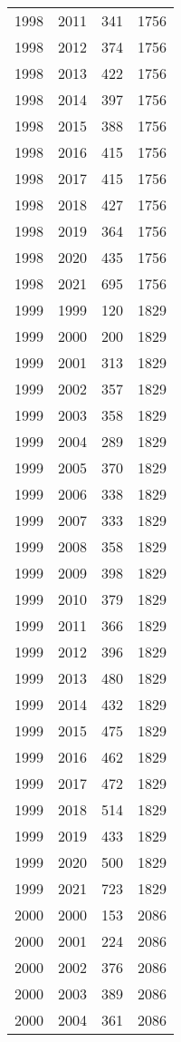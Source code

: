 \documentclass[
  11pt,
  letterpaper,
  DIV=11,
  numbers=noendperiod,
  twoside]{scrartcl}
\begin{document}
\begin{longtable}[]{@{}rrrr@{}}
1998 & 2011 & 341 & 1756 \\
1998 & 2012 & 374 & 1756 \\
1998 & 2013 & 422 & 1756 \\
1998 & 2014 & 397 & 1756 \\
1998 & 2015 & 388 & 1756 \\
1998 & 2016 & 415 & 1756 \\
1998 & 2017 & 415 & 1756 \\
1998 & 2018 & 427 & 1756 \\
1998 & 2019 & 364 & 1756 \\
1998 & 2020 & 435 & 1756 \\
1998 & 2021 & 695 & 1756 \\
1999 & 1999 & 120 & 1829 \\
1999 & 2000 & 200 & 1829 \\
1999 & 2001 & 313 & 1829 \\
1999 & 2002 & 357 & 1829 \\
1999 & 2003 & 358 & 1829 \\
1999 & 2004 & 289 & 1829 \\
1999 & 2005 & 370 & 1829 \\
1999 & 2006 & 338 & 1829 \\
1999 & 2007 & 333 & 1829 \\
1999 & 2008 & 358 & 1829 \\
1999 & 2009 & 398 & 1829 \\
1999 & 2010 & 379 & 1829 \\
1999 & 2011 & 366 & 1829 \\
1999 & 2012 & 396 & 1829 \\
1999 & 2013 & 480 & 1829 \\
1999 & 2014 & 432 & 1829 \\
1999 & 2015 & 475 & 1829 \\
1999 & 2016 & 462 & 1829 \\
1999 & 2017 & 472 & 1829 \\
1999 & 2018 & 514 & 1829 \\
1999 & 2019 & 433 & 1829 \\
1999 & 2020 & 500 & 1829 \\
1999 & 2021 & 723 & 1829 \\
2000 & 2000 & 153 & 2086 \\
2000 & 2001 & 224 & 2086 \\
2000 & 2002 & 376 & 2086 \\
2000 & 2003 & 389 & 2086 \\
2000 & 2004 & 361 & 2086 \\

\end{longtable}
\end{document}
